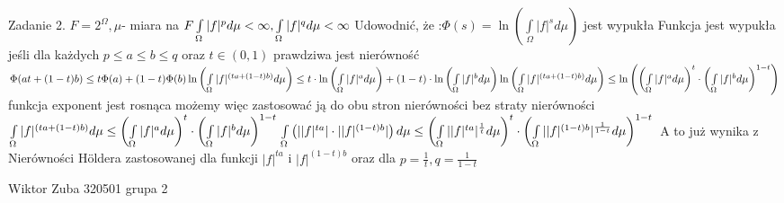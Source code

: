 \documentclass{article}
\begin{document}
Zadanie 2.
\newline
\newline
$
F=2^{\Omega},\mu$- miara na $F\newline
\int\limits_{\Omega}|f|^pd\mu<\infty,\int\limits_{\Omega}|f|^qd\mu<\infty\newline
$
Udowodnić, że :$\Phi(s)=\ln{\left(\int\limits_{\Omega}|f|^sd\mu\right)}$ jest wypukła\newline
Funkcja jest wypukła jeśli dla każdych $p\le a\le b\le q$ oraz $t\in(0,1)$ prawdziwa jest nierówność\newline
$
\Phi(at+(1-t)b)\le t\Phi(a)+(1-t)\Phi(b)\newline
\ln{\left(\int\limits_{\Omega}|f|^{(ta+(1-t)b)}d\mu\right)}\le t\cdot\ln{\left(\int\limits_{\Omega}|f|^ad\mu\right)}+(1-t)\cdot\ln{\left(\int\limits_{\Omega}|f|^bd\mu\right)}\newline
\ln{\left(\int\limits_{\Omega}|f|^{(ta+(1-t)b)}d\mu\right)}\le\ln{\left(\left(\int\limits_{\Omega}|f|^ad\mu\right)^t\cdot\left(\int\limits_{\Omega}|f|^bd\mu\right)^{1-t}\right)}\newline
$ funkcja exponent jest rosnąca możemy więc zastosować ją do obu stron nierówności bez straty nierówności\newline$
\int\limits_{\Omega}|f|^{(ta+(1-t)b)}d\mu\le\left(\int\limits_{\Omega}|f|^ad\mu\right)^t\cdot\left(\int\limits_{\Omega}|f|^bd\mu\right)^{1-t}\newline
\int\limits_{\Omega}\left(||f|^{ta}|\cdot||f|^{(1-t)b}|\right)d\mu\le\left(\int\limits_{\Omega}||f|^{ta}|^{\frac{1}{t}}d\mu\right)^t\cdot\left(\int\limits_{\Omega}||f|^{(1-t)b}|^{\frac{1}{1-t}}d\mu\right)^{1-t}\newline
$
A to już wynika z Nierówności H\"{o}ldera zastosowanej dla funkcji $|f|^{ta}$ i $|f|^{(1-t)b}$ oraz dla $p=\frac{1}{t},q=\frac{1}{1-t}$\newpage
 
Wiktor Zuba 320501 grupa 2
\newline
\end{document}
